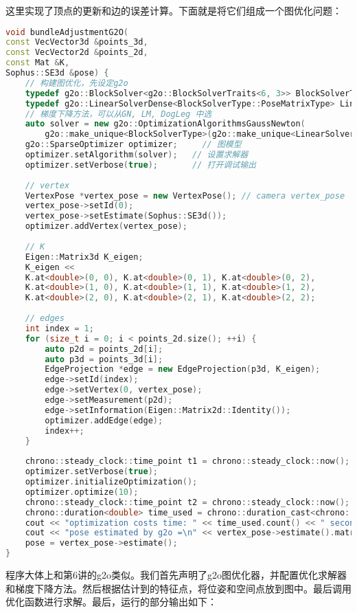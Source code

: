 这里实现了顶点的更新和边的误差计算。下面就是将它们组成一个图优化问题：
\begin{lstlisting}[language=c++,caption=slambook2/ch7/pose_estimation_3d2d.cpp（片段）]
void bundleAdjustmentG2O(
const VecVector3d &points_3d,
const VecVector2d &points_2d,
const Mat &K,
Sophus::SE3d &pose) {
	// 构建图优化，先设定g2o
	typedef g2o::BlockSolver<g2o::BlockSolverTraits<6, 3>> BlockSolverType;  // pose is 6, landmark is 3
	typedef g2o::LinearSolverDense<BlockSolverType::PoseMatrixType> LinearSolverType; // 线性求解器类型
	// 梯度下降方法，可以从GN, LM, DogLeg 中选
	auto solver = new g2o::OptimizationAlgorithmsGaussNewton(
		g2o::make_unique<BlockSolverType>(g2o::make_unique<LinearSolverType>()));
	g2o::SparseOptimizer optimizer;     // 图模型
	optimizer.setAlgorithm(solver);   // 设置求解器
	optimizer.setVerbose(true);       // 打开调试输出
	
	// vertex
	VertexPose *vertex_pose = new VertexPose(); // camera vertex_pose
	vertex_pose->setId(0);
	vertex_pose->setEstimate(Sophus::SE3d());
	optimizer.addVertex(vertex_pose);
	
	// K
	Eigen::Matrix3d K_eigen;
	K_eigen <<
	K.at<double>(0, 0), K.at<double>(0, 1), K.at<double>(0, 2),
	K.at<double>(1, 0), K.at<double>(1, 1), K.at<double>(1, 2),
	K.at<double>(2, 0), K.at<double>(2, 1), K.at<double>(2, 2);
	
	// edges
	int index = 1;
	for (size_t i = 0; i < points_2d.size(); ++i) {
		auto p2d = points_2d[i];
		auto p3d = points_3d[i];
		EdgeProjection *edge = new EdgeProjection(p3d, K_eigen);
		edge->setId(index);
		edge->setVertex(0, vertex_pose);
		edge->setMeasurement(p2d);
		edge->setInformation(Eigen::Matrix2d::Identity());
		optimizer.addEdge(edge);
		index++;
	}
	
	chrono::steady_clock::time_point t1 = chrono::steady_clock::now();
	optimizer.setVerbose(true);
	optimizer.initializeOptimization();
	optimizer.optimize(10);
	chrono::steady_clock::time_point t2 = chrono::steady_clock::now();
	chrono::duration<double> time_used = chrono::duration_cast<chrono::duration<double>>(t2 - t1);
	cout << "optimization costs time: " << time_used.count() << " seconds." << endl;
	cout << "pose estimated by g2o =\n" << vertex_pose->estimate().matrix() << endl;
	pose = vertex_pose->estimate();
}
\end{lstlisting}

程序大体上和第6讲的g2o类似。我们首先声明了g2o图优化器，并配置优化求解器和梯度下降方法。然后根据估计到的特征点，将位姿和空间点放到图中。最后调用优化函数进行求解。最后，运行的部分输出如下：

